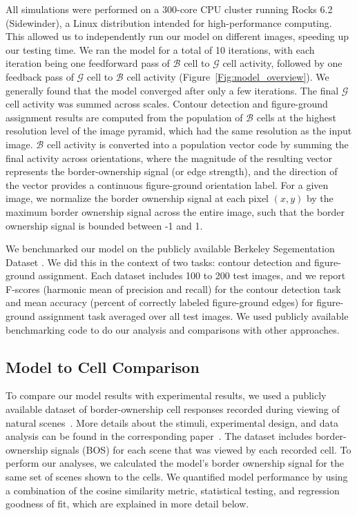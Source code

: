 All simulations were performed on a 300-core CPU cluster running Rocks 6.2 (Sidewinder), a Linux distribution intended for high-performance computing. This allowed us to independently run our model on different images, speeding up our testing time. We ran the model for a total of 10 iterations, with each iteration being one feedforward pass of $\mathcal{B}$ cell to $\mathcal{G}$ cell activity, followed by one feedback pass of $\mathcal{G}$ cell to $\mathcal{B}$ cell activity (Figure~\ref{Fig:model_overview}). We generally found that the model converged after only a few iterations. The final $\mathcal{G}$ cell activity was summed across scales. Contour detection and figure-ground assignment results are computed from the population of $\mathcal{B}$ cells at the highest resolution level of the image pyramid, which had the same resolution as the input image. $\mathcal{B}$ cell activity is converted into a population vector code by summing the final activity across orientations, where the magnitude of the resulting vector represents the border-ownership signal (or edge strength), and the direction of the vector provides a continuous figure-ground orientation label. For a given image, we normalize the border ownership signal at each pixel $(x,y)$ by the maximum border ownership signal across the entire image, such that the border ownership signal is bounded between -1 and 1.

We benchmarked our model on the publicly available Berkeley Segementation Dataset \citep{Martin_etal01}. We did this in the context of two tasks: contour detection and figure-ground assignment. Each dataset includes 100 to 200 test images, and we report F-scores (harmonic mean of precision and recall) for the contour detection task and mean accuracy (percent of correctly labeled figure-ground edges) for figure-ground assignment task averaged over all test images. We used publicly available benchmarking code to do our analysis and comparisons with other approaches.

\subsection{Model to Cell Comparison}
\label{sec:cell_model}
To compare our model results with experimental results, we used a publicly available dataset of border-ownership cell responses recorded during viewing of natural scenes~\citep{Jonathan_data}. More details about the stimuli, experimental design, and data analysis can be found in the corresponding paper~\citep{Williford_vonderHeydt16}.
The dataset includes border-ownership signals (BOS) for each scene that was viewed by each recorded cell. To perform our analyses, we calculated the model's border ownership signal for the same set of scenes shown to the cells. We quantified model performance by using a combination of the cosine similarity metric, statistical testing, and regression goodness of fit, which are explained in more detail below.
%

